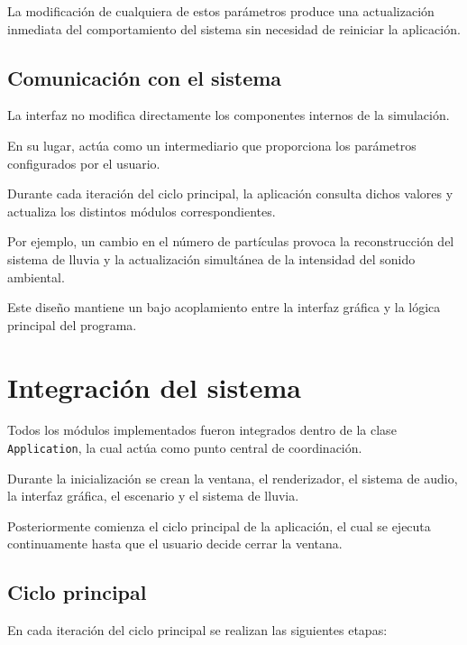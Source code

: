 La modificación de cualquiera de estos parámetros produce una actualización inmediata del comportamiento del sistema sin necesidad de reiniciar la aplicación.

\subsection{Comunicación con el sistema}

La interfaz no modifica directamente los componentes internos de la simulación.

En su lugar, actúa como un intermediario que proporciona los parámetros configurados por el usuario.

Durante cada iteración del ciclo principal, la aplicación consulta dichos valores y actualiza los distintos módulos correspondientes.

Por ejemplo, un cambio en el número de partículas provoca la reconstrucción del sistema de lluvia y la actualización simultánea de la intensidad del sonido ambiental.

Este diseño mantiene un bajo acoplamiento entre la interfaz gráfica y la lógica principal del programa.

\section{Integración del sistema}

Todos los módulos implementados fueron integrados dentro de la clase \texttt{Application}, la cual actúa como punto central de coordinación.

Durante la inicialización se crean la ventana, el renderizador, el sistema de audio, la interfaz gráfica, el escenario y el sistema de lluvia.

Posteriormente comienza el ciclo principal de la aplicación, el cual se ejecuta continuamente hasta que el usuario decide cerrar la ventana.

\subsection{Ciclo principal}

En cada iteración del ciclo principal se realizan las siguientes etapas:

